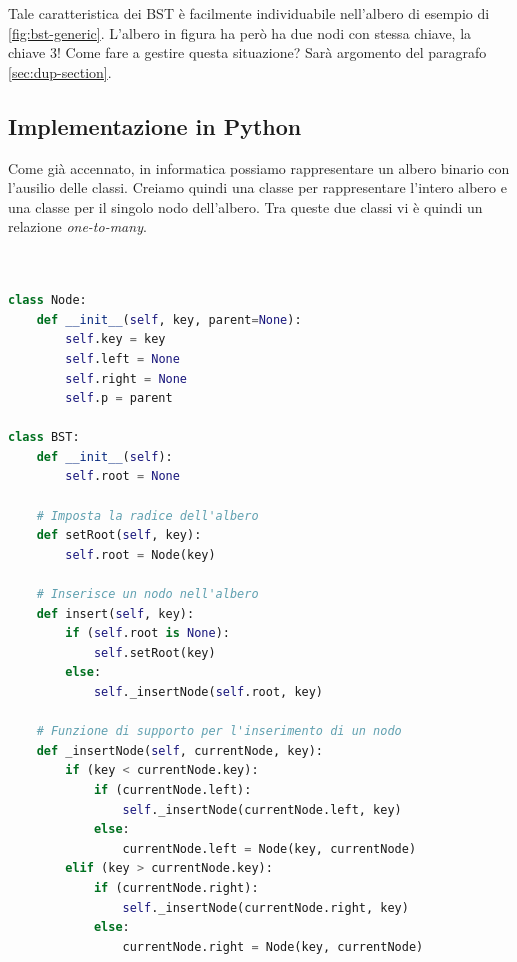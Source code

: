 \documentclass{article}
\begin{document}
Tale caratteristica dei BST è facilmente individuabile nell'albero di esempio di \cref{fig:bst-generic}. L'albero in figura ha però ha due nodi con stessa chiave, la chiave 3!
Come fare a gestire questa situazione? Sarà argomento del paragrafo \ref{sec:dup-section}.



\subsection{Implementazione in Python}

Come già accennato, in informatica possiamo rappresentare un albero binario con l'ausilio delle classi. Creiamo quindi una classe per rappresentare l'intero albero e una classe per il singolo nodo dell'albero. Tra queste due classi vi è quindi un relazione 
\textit{one-to-many}.

\vspace{5pt}

\begin{lstlisting}[language=Python, caption={Implementazione di un BST}, label=bst-implementation]


class Node:
    def __init__(self, key, parent=None):
        self.key = key 
        self.left = None
        self.right = None
        self.p = parent
        
class BST:
    def __init__(self):
        self.root = None

    # Imposta la radice dell'albero
    def setRoot(self, key):
        self.root = Node(key)
        
    # Inserisce un nodo nell'albero
    def insert(self, key):
        if (self.root is None):
            self.setRoot(key)
        else:
            self._insertNode(self.root, key)
            
    # Funzione di supporto per l'inserimento di un nodo
    def _insertNode(self, currentNode, key):
        if (key < currentNode.key):
            if (currentNode.left):
                self._insertNode(currentNode.left, key)
            else:
                currentNode.left = Node(key, currentNode)
        elif (key > currentNode.key):
            if (currentNode.right):
                self._insertNode(currentNode.right, key)
            else:
                currentNode.right = Node(key, currentNode)
\end{lstlisting}

\vspace{5pt}
\end{document}
